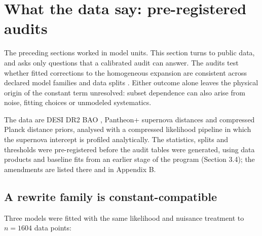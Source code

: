 \hypertarget{what-the-data-say-pre-registered-audits}{%
\section{What the data say: pre-registered
audits}\label{what-the-data-say-pre-registered-audits}}

The preceding sections worked in model units. This section turns to
public data, and asks only questions that a calibrated audit can answer.
The audits test whether fitted corrections to the homogeneous expansion
are consistent across declared model families and data splits
\citep{TsiokosDarkEnergy2026}. Either outcome alone leaves the physical
origin of the constant term unresolved: subset dependence can also arise
from noise, fitting choices or unmodeled systematics.

The data are DESI DR2 BAO \citep{DESI2025DR2}, Pantheon+ supernova
distances \citep{Brout2022} and compressed Planck distance priors,
analysed with a compressed likelihood pipeline in which the supernova
intercept is profiled analytically. The statistics, splits and
thresholds were pre-registered before the audit tables were generated,
using data products and baseline fits from an earlier stage of the
program (Section 3.4); the amendments are listed there and in Appendix
B.

\hypertarget{a-rewrite-family-is-constant-compatible}{%
\subsection{A rewrite family is
constant-compatible}\label{a-rewrite-family-is-constant-compatible}}

Three models were fitted with the same likelihood and nuisance treatment
to \(n=1604\) data points:

